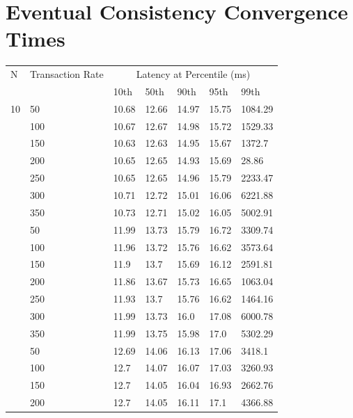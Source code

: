 \documentclass[12pt,a4paper,twoside,openany]{report}
\begin{document}


\appendix

\chapter{Eventual Consistency Convergence Times}


\begin{longtable}{@{} l l l l l l l @{}}
\toprule
N & Transaction Rate & \multicolumn{5}{c}{Latency at Percentile (ms)} \\
& & 10th & 50th & 90th & 95th & 99th \\
\hline
\endhead
10 & 50 & 10.68 & 12.66 & 14.97 & 15.75 & 1084.29 \\
& 100 & 10.67 & 12.67 & 14.98 & 15.72 & 1529.33 \\
& 150 & 10.63 & 12.63 & 14.95 & 15.67 & 1372.7 \\
& 200 & 10.65 & 12.65 & 14.93 & 15.69 & 28.86 \\
& 250 & 10.65 & 12.65 & 14.96 & 15.79 & 2233.47 \\
& 300 & 10.71 & 12.72 & 15.01 & 16.06 & 6221.88 \\
& 350 & 10.73 & 12.71 & 15.02 & 16.05 & 5002.91 \\
\hline
\pagebreak[3]
20 & 50 & 11.99 & 13.73 & 15.79 & 16.72 & 3309.74 \\
& 100 & 11.96 & 13.72 & 15.76 & 16.62 & 3573.64 \\
& 150 & 11.9 & 13.7 & 15.69 & 16.12 & 2591.81 \\
& 200 & 11.86 & 13.67 & 15.73 & 16.65 & 1063.04 \\
& 250 & 11.93 & 13.7 & 15.76 & 16.62 & 1464.16 \\
& 300 & 11.99 & 13.73 & 16.0 & 17.08 & 6000.78 \\
& 350 & 11.99 & 13.75 & 15.98 & 17.0 & 5302.29 \\
\hline
\pagebreak[3]
30 & 50 & 12.69 & 14.06 & 16.13 & 17.06 & 3418.1 \\
& 100 & 12.7 & 14.07 & 16.07 & 17.03 & 3260.93 \\
& 150 & 12.7 & 14.05 & 16.04 & 16.93 & 2662.76 \\
& 200 & 12.7 & 14.05 & 16.11 & 17.1 & 4366.88 \\

\end{longtable}
\end{document}
